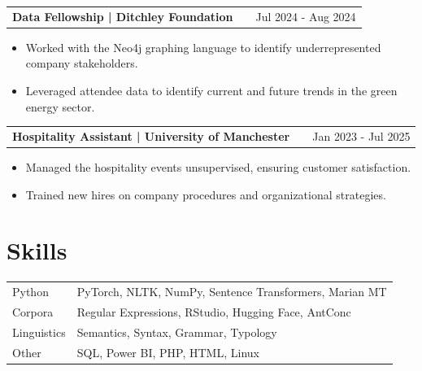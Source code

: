 \documentclass[a4paper,12pt]{article}
\makeatletter
\newenvironment{joblong}[2]
    {
    \begin{tabularx}{\linewidth}{@{}l X r@{}}
    \textbf{#1} & \hfill &  #2 \\[3.75pt]
    \end{tabularx}
    \begin{minipage}[t]{\linewidth}
    \begin{itemize}[nosep,after=\strut, leftmargin=1em, itemsep=3pt, label=\textcolor{linkcolour}{\textbullet}]
    }
    {
    \end{itemize}
    \end{minipage}    
    }
\makeatother
\begin{document}
\begin{joblong}{Data Fellowship | \normalfont Ditchley Foundation}{Jul 2024 - Aug 2024}
\item Worked with the Neo4j graphing language to identify underrepresented company stakeholders.
\item Leveraged attendee data to identify current and future trends in the green energy sector.
\end{joblong}


\begin{joblong}{Hospitality Assistant | \normalfont University of Manchester}{Jan 2023 - Jul 2025}
\item Managed the hospitality events unsupervised, ensuring customer satisfaction.
\item Trained new hires on company procedures and organizational strategies.
\end{joblong}
  





\section{Skills}
\begin{tabularx}{\linewidth}{@{}l X@{}}
Python &  \normalsize{PyTorch, NLTK, NumPy, Sentence Transformers, Marian MT}\\
Corpora  &  \normalsize{Regular Expressions, RStudio, Hugging Face, AntConc}\\  
Linguistics & \normalsize{Semantics, Syntax, Grammar, Typology}\\
Other & \normalsize{SQL, Power BI, PHP, HTML, Linux}
\end{tabularx}

\vfill
\end{document}
